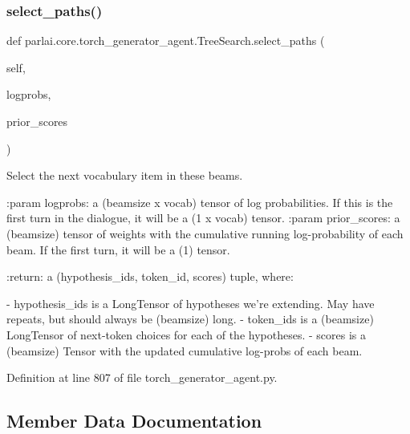 \subsubsection{\texorpdfstring{select\+\_\+paths()}{select\_paths()}}
{\footnotesize\ttfamily def parlai.\+core.\+torch\+\_\+generator\+\_\+agent.\+Tree\+Search.\+select\+\_\+paths (\begin{DoxyParamCaption}\item[{}]{self,  }\item[{}]{logprobs,  }\item[{}]{prior\+\_\+scores }\end{DoxyParamCaption})}

\begin{DoxyVerb}Select the next vocabulary item in these beams.

:param logprobs:
    a (beamsize x vocab) tensor of log probabilities. If this is the first
    turn in the dialogue, it will be a (1 x vocab) tensor.
:param prior_scores:
    a (beamsize) tensor of weights with the cumulative running
    log-probability of each beam. If the first turn, it will be a (1) tensor.

:return:
    a (hypothesis_ids, token_id, scores) tuple, where:

    - hypothesis_ids is a LongTensor of hypotheses we're extending. May have
      repeats, but should always be (beamsize) long.
    - token_ids is a (beamsize) LongTensor of next-token choices for
      each of the hypotheses.
    - scores is a (beamsize) Tensor with the updated cumulative log-probs
      of each beam.
\end{DoxyVerb}
 

Definition at line 807 of file torch\+\_\+generator\+\_\+agent.\+py.



\subsection{Member Data Documentation}
\mbox{\label{classparlai_1_1core_1_1torch__generator__agent_1_1TreeSearch_ac9e79a3effa48d2e35ac879620cd639e}} 
